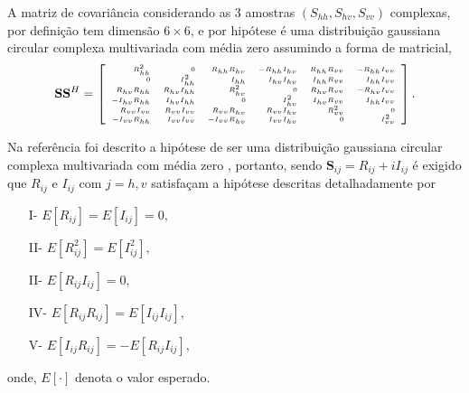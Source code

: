 \documentclass[conference]{IEEEtran}
\begin{document}
A matriz de covariância considerando as 3 amostras $(S_{hh}, S_{hv}, S_{vv})$ complexas, por definição tem dimensão $6 \times 6$, e por hipótese é uma distribuição gaussiana circular complexa multivariada com média zero assumindo a forma de matricial,  
\begin{equation*}
\tiny
\mathbf{S} \mathbf{S}^H= \left[
\begin{array}{rrrrrr}
	R_{hh}^2       & 0            &R_{hh}R_{hv}  &-R_{hh}I_{hv} &R_{hh}R_{vv} &-R_{hh}I_{vv}    \\
    0              & I_{hh}^2     &I_{hh}        &I_{hv}I_{hv}  &I_{hh}R_{vv}  &I_{hh}I_{vv}   \\
	R_{hv}R_{hh}   & R_{hv}I_{hh} &R_{hv}^2      & 0            &R_{hv}R_{vv}  &-R_{hv}I_{vv}     \\
	-I_{hv}R_{hh}  & I_{hv}I_{hh} &0             &I_{hv}^2      &I_{hv}R_{vv}  &I_{hh}I_{vv} \\
    R_{vv}I_{vv}   & R_{vv}I_{vv} &R_{vv}R_{hv}  &R_{vv}I_{hv}  &R_{vv}^2      &0            \\
	-I_{vv}R_{hh}  & I_{vv}I_{vv} &-I_{vv}R_{hv} &I_{vv}I_{hv}  &0             &I_{vv}^2     \\
\end{array}
\right].
\end{equation*}

Na referência \cite{good} foi descrito a hipótese de ser uma distribuição gaussiana circular complexa multivariada com média zero , portanto, sendo $\mathbf{S}_{ij}= R_{ij}+ i I_{ij}$ é exigido que $R_{ij}$ e $I_{ij}$ com $j=h,v$ satisfaçam a hipótese descritas detalhadamente por 
\begin{itemize}
	\item[I-] $E[R_{ij}]=E[I_{ij}]=0,$
	\item[II-] $E[R_{ij}^2]=E[I_{ij}^2],$ 
	\item[II-] $E[R_{ij}I_{ij}]=0,$  
	\item[IV-] $E[R_{ij}R_{ij}]=E[I_{ij}I_{ij}],$ 
	\item[V-] $E[I_{ij}R_{ij}]=-E[R_{ij}I_{ij}],$
\end{itemize}
onde, $E[\cdot]$ denota o valor esperado. 
\end{document}
